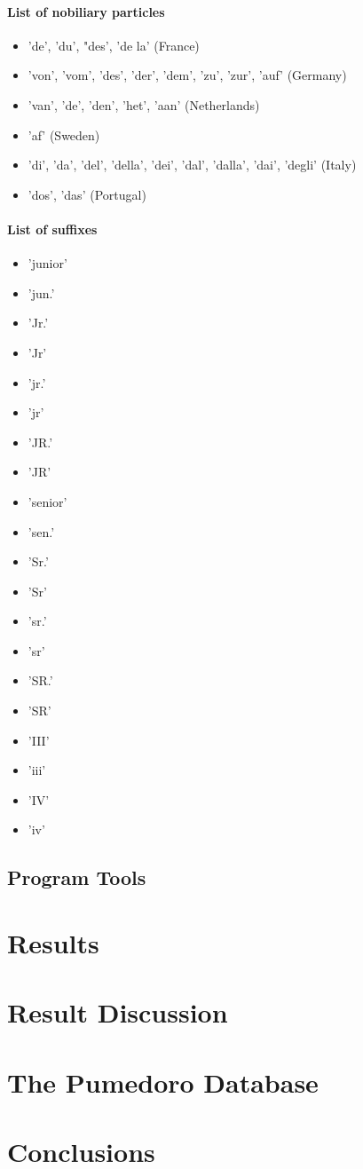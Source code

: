 \documentclass[12pt,a4paper]{article}
\begin{document}
		\paragraph{List of nobiliary particles\\}
		\begin{itemize}\itemsep-4pt
		\item 'de', 'du', "des', 'de la' (France)
		\item 'von', 'vom', 'des', 'der', 'dem', 'zu', 'zur', 'auf' (Germany)
		\item 'van', 'de', 'den', 'het', 'aan' (Netherlands)
		\item 'af' (Sweden)
		\item 'di', 'da', 'del', 'della', 'dei', 'dal', 'dalla', 'dai', 'degli' (Italy)
		\item 'dos', 'das' (Portugal)
		\end{itemize}
		
		\paragraph{List of suffixes\\}
		\begin{itemize}\itemsep-4pt
			\item 'junior'
			\item 'jun.'
			\item 'Jr.'
			\item 'Jr'
			\item 'jr.'
			\item 'jr'
			\item 'JR.'
			\item 'JR'
			\item 'senior'
			\item 'sen.'
			\item 'Sr.'
			\item 'Sr'
			\item 'sr.'
			\item 'sr'
			\item 'SR.'
			\item 'SR'
			\item 'III'
			\item 'iii'
			\item 'IV'
			\item 'iv'
		\end{itemize}
		\subsection{Program Tools}
		
	\section{Results}
		
	\section{Result Discussion}
	
	\section{The Pumedoro Database}
	
	\section{Conclusions}
	
	
	
\end{document}
